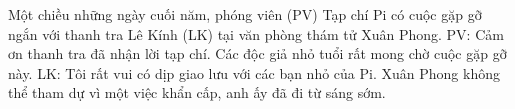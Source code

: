\newpage
\graphicspath{{../suyluancungbi/xuanphong/}}
\begingroup
{} %
\centering
\endgroup
\vspace*{50pt}
%	
%	
%	
	Một chiều những ngày cuối năm, phóng viên (PV) Tạp chí Pi có cuộc gặp gỡ ngắn với thanh tra Lê Kính (LK) tại văn phòng thám tử Xuân Phong.
	\vskip 0.1cm
	PV: Cảm ơn thanh tra đã nhận lời tạp chí. Các độc giả nhỏ tuổi rất mong chờ cuộc gặp gỡ này.
	\vskip 0.1cm
	LK: Tôi rất vui có dịp giao lưu với các bạn nhỏ của Pi. Xuân Phong không thể tham dự vì một việc khẩn cấp, anh ấy đã đi từ sáng sớm.
